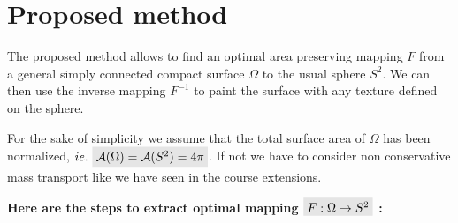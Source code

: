 \documentclass[11pt,a4paper]{article}
\renewcommand{\colbox}[1]{\colorbox{lightgray}{$ #1 $}}
\begin{document}
\section{Proposed method}

The proposed method allows to find an optimal area preserving mapping $F$ from a general simply connected compact surface $\Omega$ to the usual sphere $S^2$. We can then use the inverse mapping $F^{-1}$ to paint the surface with any texture defined on the sphere.

\vskip 0.3cm

For the sake of simplicity we assume that the total surface area of $\Omega$ has been normalized, $ie.\ \colbox{\mathcal{A}(\Omega) = \mathcal{A}(S^2) = 4\pi}$. 
If not we have to consider non conservative mass transport like we have seen in the course extensions.

\vskip 0.3cm
\textbf{Here are the steps to extract optimal mapping $\colbox{F : \Omega \to S^2}$ :}
\vskip 0.3cm
\end{document}
